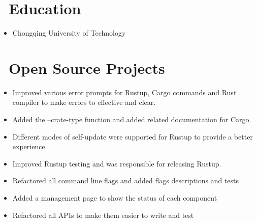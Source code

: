 \documentclass{resume}
\newcommand{\en}[1]{#1}
\newcommand{\zh}[1]{}
\begin{document}
\section{\faGraduationCap\ \en{Education}\zh{教育经历}}
\en{}
\zh{\datedsubsection{\textbf{软件工程 本科}}{2015/09 -- 2019/06}}
\begin{itemize}
      \item \en{Chongqing University of Technology}
            \zh{重庆理工大学}
\end{itemize}

\section{\faGithubAlt\ \en{Open Source Projects}\zh{开源项目}}
\en{}
\zh{\role{活跃维护者}{\href{https://github.com/search?q=repo:rust-lang/cargo+repo:rust-lang/rustup+repo:rust-lang/rust+author:hi-rustin&type=commits}{380+ 个提交}}}
\begin{itemize}
      \item \en{Improved various error prompts for Rustup, Cargo commands and Rust compiler to make errors to effective and clear.}
            \zh{改善了大量 Rustup、Cargo 命令和 Rust 编译器的错误提示，让错误更有效更清晰。}
      \item \en{Added the --crate-type function and added related documentation for Cargo.}
            \zh{为 Cargo 添加了 --crate-type 功能和相关文档。}
      \item \en{Different modes of self-update were supported for Rustup to provide a better experience.}
            \zh{为 Rustup 支持了 self-update 的不同模式来提供更好的使用体验。}
      \item \en{Improved Rustup testing and was responsible for releasing Rustup.}
            \zh{改善 Rustup 测试，负责发布 Rustup。}
\end{itemize}

\en{}
\zh{\role{活跃贡献者}{\href{https://github.com/grafana/phlare/commits?author=hi-rustin}{28+ 个提交}}}
\begin{itemize}
      \item \en{Refactored all command line flags and added flags descriptions and tests}
            \zh{重构了所有命令行参数，并添加了参数说明和测试}
      \item \en{Added a management page to show the status of each component}
            \zh{添加了管理页面展示各组件状态}
      \item \en{Refactored all APIs to make them easier to write and test}
            \zh{重构了所有 API 使其更容易编写和测试}
\end{itemize}
\end{document}
